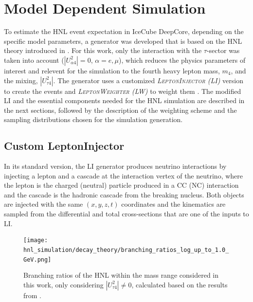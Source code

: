 \section{Model Dependent Simulation} 

To estimate the HNL event expectation in IceCube DeepCore, depending on the specific model parameters, a generator was developed that is based on the HNL theory introduced in . For this work, only the interaction with the $\tau$-sector was taken into account ($|U_{\alpha4}^2|=0$, $\alpha=e,\mu$), which reduces the physics parameters of interest and relevent for the simulation to the fourth heavy lepton mass, $m_4$, and the mixing, $|U_{\tau4}^2|$. The generator uses a customized \textit{\textsc{LeptonInjector} (LI)} version to create the events and \textit{\textsc{LeptonWeighter} (LW)} to weight them . The modified LI and the essential components needed for the HNL simulation are described in the next sections, followed by the description of the weighting scheme and the sampling distributions chosen for the simulation generation.


\subsection{Custom LeptonInjector} 

In its standard version, the LI generator produces neutrino interactions by injecting a lepton and a cascade at the interaction vertex of the neutrino, where the lepton is the charged (neutral) particle produced in a CC (NC) interaction and the cascade is the hadronic cascade from the breaking nucleus. Both objects are injected with the same $(x,y,z,t)$ coordinates and the kinematics are sampled from the differential and total cross-sections that are one of the inputs to LI.

\begin{figure}[h]
    \texttt{[image: hnl\_simulation/decay\_theory/branching\_ratios\_log\_up\_to\_1.0\_GeV.png]}
    \caption[HNL branching ratios]{Branching ratios of the HNL within the mass range considered in this work, only considering $|U_{\tau4}^2| \neq 0$, calculated based on the results from \cite{Coloma:2020lgy}.}
\end{figure}

